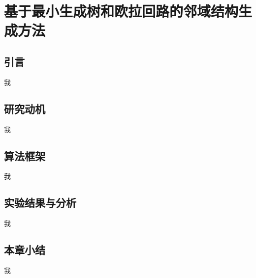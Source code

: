 \chapter{基于最小生成树和欧拉回路的邻域结构生成方法}

\section{引言}

我

\section{研究动机}

我

\section{算法框架}

我

\section{实验结果与分析}

我

\section{本章小结}

我